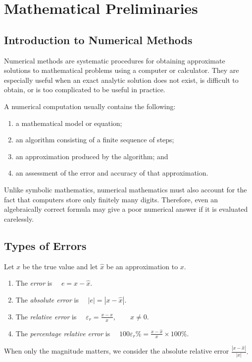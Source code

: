 \chapter{Mathematical Preliminaries}

\section{Introduction to Numerical Methods}

Numerical methods are systematic procedures for obtaining approximate solutions to mathematical problems using a computer or calculator. They are especially useful when an exact analytic solution does not exist, is difficult to obtain, or is too complicated to be useful in practice.

A numerical computation usually contains the following:
\begin{enumerate}[leftmargin=1.5cm]
  \item a mathematical model or equation;
  \item an algorithm consisting of a finite sequence of steps;
  \item an approximation produced by the algorithm; and
  \item an assessment of the error and accuracy of that approximation.
\end{enumerate}

Unlike symbolic mathematics, numerical mathematics must also account for the fact that computers store only finitely many digits. Therefore, even an algebraically correct formula may give a poor numerical answer if it is evaluated carelessly.

\section{Types of Errors}

\begin{definition}
Let $x$ be the true value and let $\widehat{x}$ be an approximation to $x$.
\begin{enumerate}[label=(\alph*),leftmargin=2.7em]
  \item The \emph{error} is
     $\quad e=x-\widehat{x}.$
  \item The \emph{absolute error} is
     $\quad |e|=|x-\widehat{x}|.$
  \item The \emph{relative error} is
     $\quad \varepsilon_r=\frac{x-\widehat{x}}{x},\qquad x\ne0.$
  \item The \emph{percentage relative error} is
  $\quad 100\varepsilon_r\% = \frac{x-\widehat{x}}{x} \times 100\%.$
\end{enumerate}
When only the magnitude matters, we consider the absolute relative error
\(\displaystyle{\frac{|x-\widehat{x}|}{|x|}.}\)
\end{definition}

